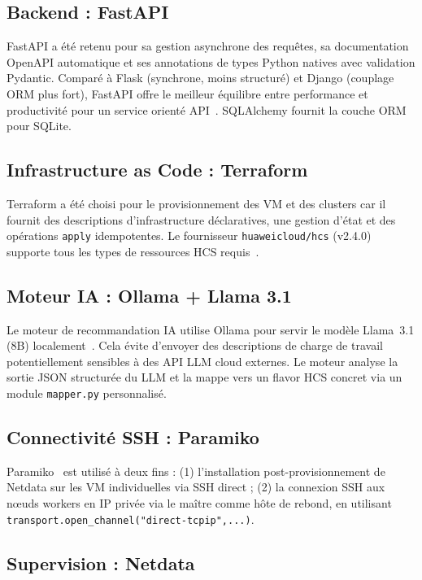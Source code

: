 \subsection{Backend : FastAPI}

FastAPI a été retenu pour sa gestion asynchrone des requêtes, sa documentation
OpenAPI automatique et ses annotations de types Python natives avec validation
Pydantic. Comparé à Flask (synchrone, moins structuré) et Django (couplage ORM plus
fort), FastAPI offre le meilleur équilibre entre performance et productivité pour un
service orienté API~\cite{fastapi_docs}. SQLAlchemy fournit la couche ORM pour SQLite.

\subsection{Infrastructure as Code : Terraform}

Terraform a été choisi pour le provisionnement des VM et des clusters car il fournit
des descriptions d'infrastructure déclaratives, une gestion d'état et des opérations
\texttt{apply} idempotentes. Le fournisseur \texttt{huaweicloud/hcs} (v2.4.0) supporte
tous les types de ressources HCS requis~\cite{hcs_terraform_provider}.

\subsection{Moteur IA : Ollama + Llama 3.1}

Le moteur de recommandation IA utilise Ollama pour servir le modèle Llama~3.1 (8B)
localement~\cite{ollama_docs, llama31}. Cela évite d'envoyer des descriptions de charge
de travail potentiellement sensibles à des API LLM cloud externes. Le moteur analyse
la sortie JSON structurée du LLM et la mappe vers un flavor HCS concret via un module
\texttt{mapper.py} personnalisé.

\subsection{Connectivité SSH : Paramiko}

Paramiko~\cite{paramiko_docs} est utilisé à deux fins : (1) l'installation
post-provisionnement de Netdata sur les VM individuelles via SSH direct ; (2) la
connexion SSH aux nœuds workers en IP privée via le maître comme hôte de rebond,
en utilisant \texttt{transport.open\_channel("direct-tcpip",...)}.

\subsection{Supervision : Netdata}

